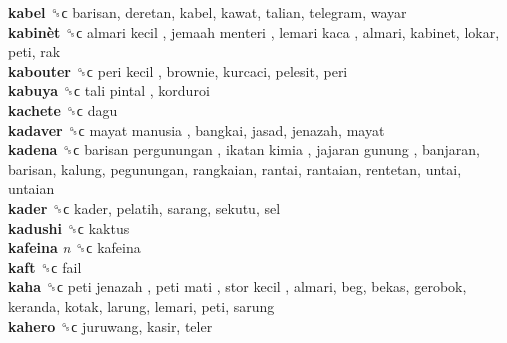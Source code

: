 \textbf{kabel} ␝ϲ  barisan, deretan, kabel, kawat, talian, telegram, wayar  \\
\textbf{kabinèt} ␝ϲ   almari kecil ,  jemaah menteri ,  lemari kaca , almari, kabinet, lokar, peti, rak  \\
\textbf{kabouter} ␝ϲ   peri kecil , brownie, kurcaci, pelesit, peri  \\
\textbf{kabuya} ␝ϲ   tali pintal , korduroi  \\
\textbf{kachete} ␝ϲ  dagu  \\
\textbf{kadaver} ␝ϲ   mayat manusia , bangkai, jasad, jenazah, mayat  \\
\textbf{kadena} ␝ϲ   barisan pergunungan ,  ikatan kimia ,  jajaran gunung , banjaran, barisan, kalung, pegunungan, rangkaian, rantai, rantaian, rentetan, untai, untaian  \\
\textbf{kader} ␝ϲ  kader, pelatih, sarang, sekutu, sel  \\
\textbf{kadushi} ␝ϲ  kaktus  \\
\textbf{kafeina} \emph{n}  ␝ϲ  kafeina  \\
\textbf{kaft} ␝ϲ  fail  \\
\textbf{kaha} ␝ϲ   peti jenazah ,  peti mati ,  stor kecil , almari, beg, bekas, gerobok, keranda, kotak, larung, lemari, peti, sarung  \\
\textbf{kahero} ␝ϲ  juruwang, kasir, teler  \\
